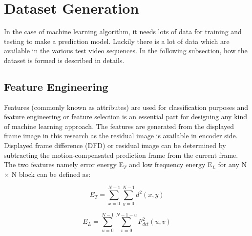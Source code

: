 \documentclass{article}
\begin{document}



\section{Dataset Generation}
\label{sec:Dataset Generation}

In the case of machine learning algorithm, it needs lots of data for training and testing to make a prediction model. Luckily there is a lot of data which are available in the various test video sequences. In the following subsection, how the dataset is formed is described in details.

\subsection{Feature Engineering}
\label{subsec:Feature Engineering}
Features (commonly known as attributes) are used for classification purposes and feature engineering or feature selection is an essential part for designing any kind of machine learning approach. The features are generated from the displayed frame image in this research as the residual image is available in encoder side. Displayed frame difference (DFD) or residual image can be determined by subtracting the motion-compensated prediction frame from the current frame. The two features namely error energy E$_{T}$ and low frequency energy E$_{L}$ for any N $\times$ N block can be defined as:

\begin{equation}
\label{eqn_example:ET}
E{_{T}}=\sum\limits_{x = 0}^{N-1} \sum\limits_{y = 0}^{N-1}d^{ 2}(x,y)
\end{equation}

\begin{equation}
\label{eqn_example:EL}
E_{L} = \sum\limits_{u = 0}^{N-1} \sum\limits_{v = 0}^{N-1-u}F^{2}_{dct}(u,v)
\end{equation}
\end{document}
